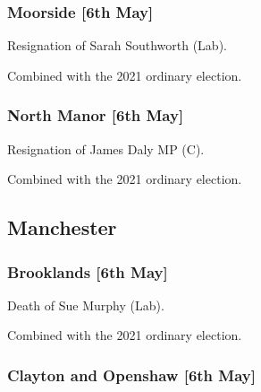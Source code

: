 \documentclass[a4paper,openany]{book}
\begin{document}
\begin{resultsiii}
\subsubsection*{Moorside \hspace*{\fill}\nolinebreak[1]%
	\enspace\hspace*{\fill}
	[6th May]}


Resignation of Sarah Southworth (Lab).

Combined with the 2021 ordinary election.

\subsubsection*{North Manor \hspace*{\fill}\nolinebreak[1]%
	\enspace\hspace*{\fill}
	[6th May]}


Resignation of James Daly MP (C).

Combined with the 2021 ordinary election.

\subsection*{Manchester}

\subsubsection*{Brooklands \hspace*{\fill}\nolinebreak[1]%
	\enspace\hspace*{\fill}
	[6th May]}


Death of Sue Murphy (Lab).

Combined with the 2021 ordinary election.

\subsubsection*{Clayton and Openshaw \hspace*{\fill}\nolinebreak[1]%
	\enspace\hspace*{\fill}
	[6th May]}



\end{resultsiii}
\end{document}
